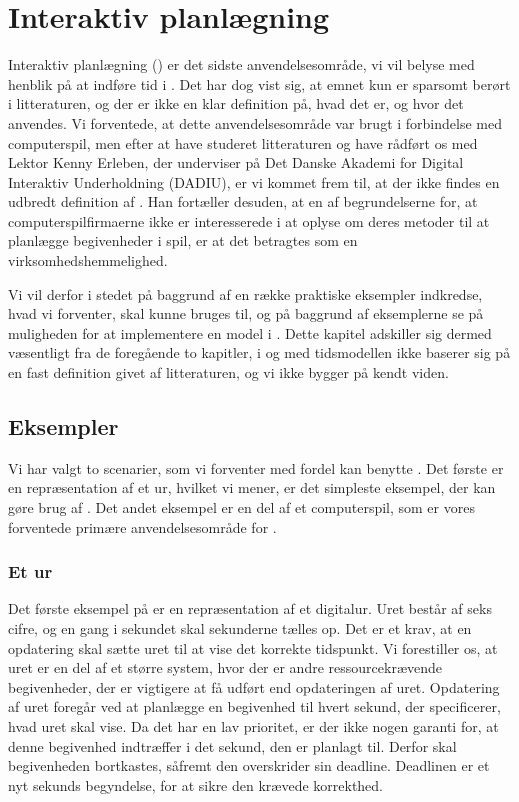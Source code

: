 \chapter{Interaktiv planlægning}
\label{chap:is}
Interaktiv planlægning (\is) er det sidste anvendelsesområde, vi vil belyse med henblik på at indføre tid i \pycsp. Det har dog vist sig, at emnet kun er sparsomt berørt i litteraturen, og der er ikke en klar definition på, hvad det er, og hvor det anvendes. 
Vi forventede, at dette anvendelsesområde var brugt i forbindelse med computerspil, men efter at have studeret litteraturen og have rådført os med Lektor Kenny Erleben, der underviser på Det Danske Akademi for Digital Interaktiv Underholdning (DADIU), er vi kommet frem til, at der ikke findes en udbredt definition af \is. Han fortæller desuden, at en af begrundelserne for, at computerspilfirmaerne ikke er interesserede i at oplyse om deres metoder til at planlægge begivenheder i spil, er at det  betragtes som en  virksomhedshemmelighed. 

Vi vil derfor i stedet på baggrund af en række praktiske eksempler indkredse, hvad vi forventer, \is skal kunne bruges til, og på baggrund af eksemplerne se på muligheden for at implementere en model i \pycsp. Dette kapitel adskiller sig dermed væsentligt fra de foregående to kapitler, i og med tidsmodellen ikke baserer sig på en fast definition givet af litteraturen, og vi ikke bygger på kendt viden.

\section{Eksempler}
Vi har valgt to scenarier, som vi forventer med fordel kan benytte \is. Det første er en repræsentation af et ur, hvilket vi mener, er det simpleste eksempel, der kan gøre brug af \is. Det andet eksempel er en del af et computerspil, som er vores forventede primære anvendelsesområde for \is. 

\subsection{Et ur}
Det første eksempel på \is er en repræsentation af et digitalur. Uret består af seks cifre, og en gang i sekundet skal sekunderne tælles op. Det er et  krav, at en opdatering skal sætte uret til at vise det korrekte tidspunkt. Vi forestiller os, at uret er en del af et større system, hvor der er andre ressourcekrævende begivenheder, der er vigtigere at få udført end opdateringen af uret. Opdatering af uret foregår ved at planlægge en begivenhed til hvert sekund, der specificerer, hvad uret skal vise. Da det har en lav prioritet, er der ikke nogen garanti for, at denne begivenhed indtræffer i det sekund, den er planlagt til. Derfor skal begivenheden  bortkastes, såfremt den overskrider sin deadline. Deadlinen er et nyt sekunds begyndelse, for at sikre den krævede korrekthed. 

